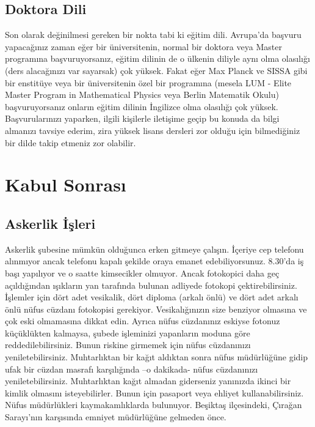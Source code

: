 \documentclass[12pt]{article}
\begin{document}
\subsection{Doktora Dili}

Son olarak değinilmesi gereken bir nokta tabi ki eğitim dili. Avrupa'da başvuru yapacağınız zaman eğer bir üniversitenin, normal bir doktora veya Master programına başvuruyorsanız, eğitim dilinin de o ülkenin diliyle aynı olma olasılığı (ders alacağınızı var sayarsak) çok yüksek. Fakat eğer Max Planck ve SISSA gibi bir enstitüye veya bir üniversitenin özel bir programına (mesela LUM - Elite Master Program in Mathematical Physics veya Berlin Matematik Okulu) başvuruyorsanız onların eğitim dilinin İngilizce olma olasılığı çok yüksek. Başvurularınızı yaparken, ilgili kişilerle iletişime geçip bu konuda da bilgi almanızı tavsiye ederim, zira yüksek lisans dersleri zor olduğu için bilmediğiniz bir dilde takip etmeniz zor olabilir. 

%
%
\section{Kabul Sonrası}
\subsection{Askerlik İşleri}

Askerlik şubesine mümkün olduğunca erken gitmeye çalışın. İçeriye cep telefonu alınmıyor ancak telefonu kapalı şekilde oraya emanet edebiliyorsunuz. 8.30’da iş başı yapılıyor ve o saatte kimsecikler olmuyor. Ancak fotokopici daha geç açıldığından ışıkların yan tarafında bulunan adliyede fotokopi çektirebilirsiniz. İşlemler için dört adet vesikalik, dört diploma (arkalı önlü) ve dört adet arkalı önlü nüfus cüzdanı fotokopisi gerekiyor. Vesikalığınızın size benziyor olmasına ve çok eski olmamasına dikkat edin. Ayrıca nüfus cüzdanınız eskiyse fotonuz küçüklükten kalmaysa, şubede işleminizi yapanların moduna göre reddedilebilirsiniz. Bunun riskine girmemek için nüfus cüzdanınızı yeniletebilirsiniz. Muhtarlıktan bir kağıt aldıktan sonra nüfus müdürlüğüne gidip ufak bir cüzdan masrafı karşılığında –o dakikada- nüfus cüzdanınızı yeniletebilirsiniz. Muhtarlıktan kağıt almadan giderseniz yanınızda ikinci bir kimlik olmasını isteyebilirler. Bunun için pasaport veya ehliyet kullanabilirsiniz. Nüfus müdürlükleri kaymakamlıklarda bulunuyor. Beşiktaş ilçesindeki, Çırağan Sarayı’nın karşısında emniyet müdürlüğüne gelmeden önce. 
\end{document}
